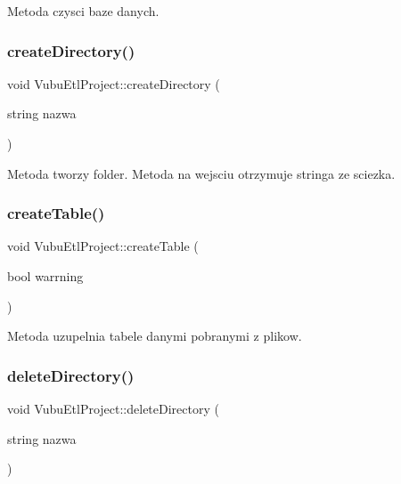 Metoda czysci baze danych. 

\mbox{\label{class_vubu_etl_project_a1a73781c59eb8b9f5b0c9ed43055adf0}} 
\subsubsection{\texorpdfstring{create\+Directory()}{createDirectory()}}
{\footnotesize\ttfamily void Vubu\+Etl\+Project\+::create\+Directory (\begin{DoxyParamCaption}\item[{string}]{nazwa }\end{DoxyParamCaption})\hspace{0.3cm}{\ttfamily [private]}}

Metoda tworzy folder. Metoda na wejsciu otrzymuje stringa ze sciezka. \mbox{\label{class_vubu_etl_project_a3d68f35327d2d00dc5369312b85364dc}} 
\subsubsection{\texorpdfstring{create\+Table()}{createTable()}}
{\footnotesize\ttfamily void Vubu\+Etl\+Project\+::create\+Table (\begin{DoxyParamCaption}\item[{bool}]{warrning }\end{DoxyParamCaption})\hspace{0.3cm}{\ttfamily [private]}}



Metoda uzupelnia tabele danymi pobranymi z plikow. 

\mbox{\label{class_vubu_etl_project_a64379c0dc064b7b4ca57ff2c627b5cf8}} 
\subsubsection{\texorpdfstring{delete\+Directory()}{deleteDirectory()}}
{\footnotesize\ttfamily void Vubu\+Etl\+Project\+::delete\+Directory (\begin{DoxyParamCaption}\item[{string}]{nazwa }\end{DoxyParamCaption})\hspace{0.3cm}{\ttfamily [private]}}

